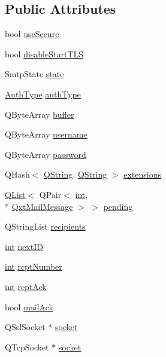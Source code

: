 \subsection*{Public Attributes}
\begin{DoxyCompactItemize}
\item 
bool \hyperlink{class_qxt_smtp_private_a90281928af777a73ba329b3c7ebd5a7d}{use\-Secure}
\item 
bool \hyperlink{class_qxt_smtp_private_a21526a7620fa2ad702fcfdde56fe7c1b}{disable\-Start\-T\-L\-S}
\item 
Smtp\-State \hyperlink{class_qxt_smtp_private_a85f43730b65a043e30cb6f1304abe898}{state}
\item 
\hyperlink{class_qxt_smtp_private_a61d8923026f0f75d0132d1bd42f4f4bc}{Auth\-Type} \hyperlink{class_qxt_smtp_private_a90195242c7f820f8745692e2d53300b3}{auth\-Type}
\item 
Q\-Byte\-Array \hyperlink{class_qxt_smtp_private_a896f826c5d859de186f7d6bdea4d7252}{buffer}
\item 
Q\-Byte\-Array \hyperlink{class_qxt_smtp_private_acdf3312139d468db12f6e899529a3c70}{username}
\item 
Q\-Byte\-Array \hyperlink{class_qxt_smtp_private_a5d5ba88d1e4a5c081bcf85a45274cd79}{password}
\item 
Q\-Hash$<$ \hyperlink{group___u_a_v_objects_plugin_gab9d252f49c333c94a72f97ce3105a32d}{Q\-String}, \hyperlink{group___u_a_v_objects_plugin_gab9d252f49c333c94a72f97ce3105a32d}{Q\-String} $>$ \hyperlink{class_qxt_smtp_private_af132a9647690d51eb59b8afddb10a2c7}{extensions}
\item 
\hyperlink{class_q_list}{Q\-List}$<$ Q\-Pair$<$ \hyperlink{ioapi_8h_a787fa3cf048117ba7123753c1e74fcd6}{int}, \\*
\hyperlink{class_qxt_mail_message}{Qxt\-Mail\-Message} $>$ $>$ \hyperlink{class_qxt_smtp_private_aee4dfcb292371e56fa55810e986ba6c7}{pending}
\item 
Q\-String\-List \hyperlink{class_qxt_smtp_private_a648c87072234df4dd567e616f258782b}{recipients}
\item 
\hyperlink{ioapi_8h_a787fa3cf048117ba7123753c1e74fcd6}{int} \hyperlink{class_qxt_smtp_private_a18e3db2a31aa5d8652ec03c3fff4511c}{next\-I\-D}
\item 
\hyperlink{ioapi_8h_a787fa3cf048117ba7123753c1e74fcd6}{int} \hyperlink{class_qxt_smtp_private_a1ce9fc169e62f6c50f3b7a91b4632b0d}{rcpt\-Number}
\item 
\hyperlink{ioapi_8h_a787fa3cf048117ba7123753c1e74fcd6}{int} \hyperlink{class_qxt_smtp_private_a28de6f0c7c76aaa7ea02fef26d73ae2e}{rcpt\-Ack}
\item 
bool \hyperlink{class_qxt_smtp_private_a177d60fd3b1d4e84eba7c981f356d623}{mail\-Ack}
\item 
Q\-Ssl\-Socket $\ast$ \hyperlink{class_qxt_smtp_private_af17220495be77a43fd34228ab7bef36e}{socket}
\item 
Q\-Tcp\-Socket $\ast$ \hyperlink{class_qxt_smtp_private_a38fdddc6a7ebac21cc8ada0b6079664d}{socket}
\end{DoxyCompactItemize}
